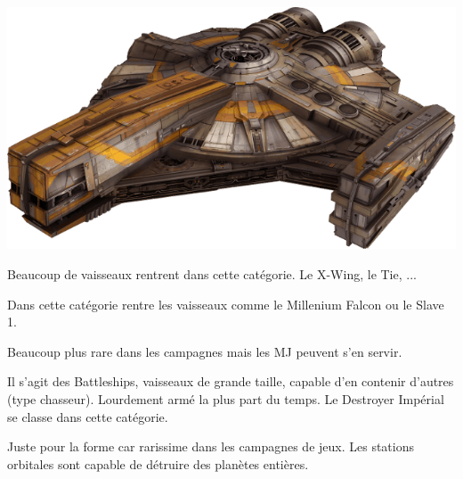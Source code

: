 \begin{center}
    \includegraphics[width=0.9\linewidth]{img/equipement/navette.png}
\end{center}

\begin{description}[align=left]
    \item [Chasseur léger]
        Beaucoup de vaisseaux rentrent dans cette catégorie. Le X-Wing, le Tie, ...

    \item [Navette]
        Dans cette catégorie rentre les vaisseaux comme le Millenium Falcon ou le Slave 1.

    \item [Croiseur]
        Beaucoup plus rare dans les campagnes mais les MJ peuvent s’en servir.

    \item [Bâtiment]
        Il s’agit des Battleships, vaisseaux de grande taille, capable d’en contenir d’autres (type chasseur). Lourdement armé la plus part du temps. Le Destroyer Impérial se classe dans cette catégorie.

    \item [Station Orbitale]
        Juste pour la forme car rarissime dans les campagnes de jeux. Les stations orbitales sont capable de détruire des planètes entières.
\end{description}

